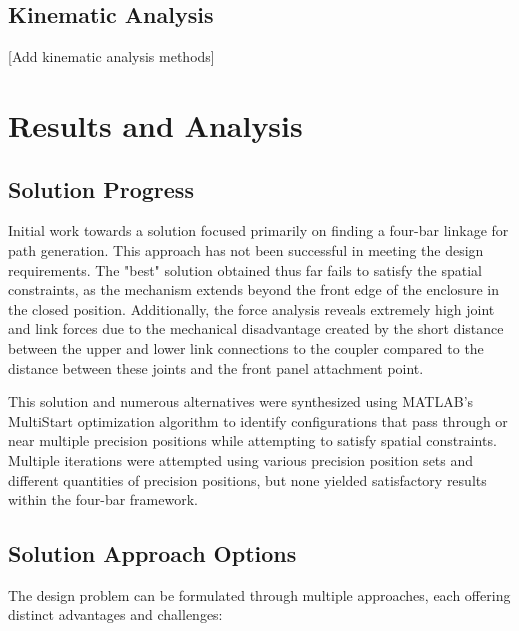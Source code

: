 \documentclass[12pt]{article}
\begin{document}
\subsection{Kinematic Analysis}
[Add kinematic analysis methods]

\section{Results and Analysis}
\label{sec:results}

\subsection{Solution Progress}
\label{sec:solution_progress}

Initial work towards a solution focused primarily on finding a four-bar linkage for path generation. This approach has not been successful in meeting the design requirements. The "best" solution obtained thus far fails to satisfy the spatial constraints, as the mechanism extends beyond the front edge of the enclosure in the closed position. Additionally, the force analysis reveals extremely high joint and link forces due to the mechanical disadvantage created by the short distance between the upper and lower link connections to the coupler compared to the distance between these joints and the front panel attachment point.

This solution and numerous alternatives were synthesized using MATLAB's MultiStart optimization algorithm to identify configurations that pass through or near multiple precision positions while attempting to satisfy spatial constraints. Multiple iterations were attempted using various precision position sets and different quantities of precision positions, but none yielded satisfactory results within the four-bar framework.

\subsection{Solution Approach Options}
\label{sec:approach_options}

The design problem can be formulated through multiple approaches, each offering distinct advantages and challenges:
\end{document}
